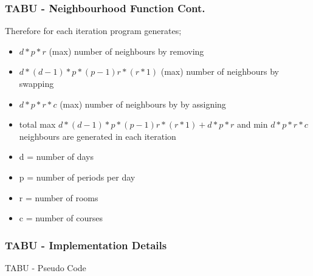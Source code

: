 \documentclass{beamer}
\makeatletter
\newenvironment{algorithm}[1][]{%
  \def\@captype{algorithm}%
  \par\nobreak\begin{center}\nobreak}
  {\par\nobreak\end{center}\nobreak}
\newcounter{algorithm}
\makeatother
\begin{document}
\begin{frame}
\frametitle{TABU - Neighbourhood Function Cont.}
Therefore for each iteration program generates;
\begin{itemize}
\item  $ d*p*r$ (max) number of neighbours by removing
\item  $d*(d-1)*p*(p-1)r*(r*1) $ (max) number of neighbours by swapping 
\item $ d*p*r*c$ (max) number of neighbours by by assigning
\item total max $d*(d-1)*p*(p-1)r*(r*1) + d*p*r $ and min $ d*p*r*c$ neighbours are generated in each iteration
\item d = number of days
\item p = number of periods per day
\item r = number of rooms
\item c = number of courses
\end{itemize}
\end{frame}

\begin{frame}[allowframebreaks] 
\frametitle{TABU  - Implementation Details}
\begin{algorithm}[H]
\begin{algorithmic}[1]
\REPEAT
{}

\ENDIF
{}
\ENDIF
\ENDIF
\ENDFOR
\ENDIF
{}
\ENDIF
\ENDFOR
\ENDIF
\ENDFOR
{}
\ENDIF
{}
\end{algorithmic}
\caption{TABU - Pseudo Code}
\label{alg:seq}
\end{algorithm}
\end{frame}
\end{document}
